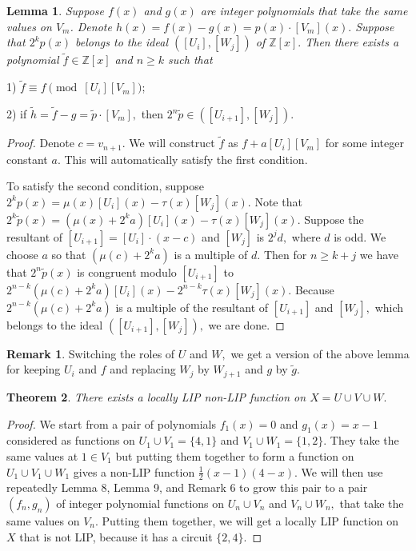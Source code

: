 \documentclass[10pt]{article}
\newtheorem{theorem}{Theorem}
\newtheorem{lemma}[theorem]{Lemma}
\theoremstyle{definition}
\newtheorem{remark}{Remark}
\begin{document}
\begin{lemma} Suppose $f(x)$ and $g(x)$ are integer polynomials that take the same values on $V_m$. Denote $h(x)=f(x)-g(x) = p(x) \cdot [V_m](x). $ Suppose that $2^kp(x)$ belongs to the ideal $([U_i],[W_j])$ of $\mathbb Z [x].$ Then there exists a polynomial $\tilde{f}\in \mathbb Z[x]$ and $n\geq k$ such that
\end{lemma}

1) $\tilde{f} \equiv f \pmod {[U_{i}][V_m]}$;

2)  if $\tilde{h}=  \tilde{f}- g =\tilde{p}\cdot [V_{m}],$ then $2^n\tilde{p}\in ([U_{i+1}],[W_j]).$  

\begin{proof} 
Denote $c=v_{n+1}.$ We will construct $\tilde{f}$ as $f+a[U_i][V_m]$ for some integer constant $a.$ This will automatically satisfy the first condition.

To satisfy the second condition, suppose $2^kp(x)=\mu(x)[U_i](x)-\tau(x)[W_j](x).$ Note that $2^k\tilde{p}(x)=(\mu(x)+2^k a )[U_i](x)-\tau(x)[W_j](x).$  Suppose the resultant of $[U_{i+1}]=[U_i]\cdot (x-c)$ and $[W_j]$ is $2^{j}d,$ where $d$ is odd. We choose $a$ so that $(\mu(c)+2^k a)$ is a multiple of $d$. Then for $n\geq k+j$ we have  that $2^n\tilde{p}(x)$ is congruent modulo $[U_{i+1}]$ to $2^{n-k}(\mu(c)+2^k a)[U_i](x)-2^{n-k}\tau(x)[W_j](x).$ Because $2^{n-k}(\mu(c)+2^k a)$ is a multiple of  the resultant of $[U_{i+1}]$ and $[W_j],$ which belongs to the ideal $([U_{i+1}],[W_j]),$ we are done.
\end{proof}

\begin{remark} Switching the roles of $U$ and $W,$ we get a version of the above lemma for keeping $U_i$ and $f$ and replacing $W_j$ by $W_{j+1}$ and $g$ by $\tilde{g}$.
\end{remark}

\begin{theorem} \label{TnonLIP} There exists a locally LIP non-LIP function on $X=U\cup V \cup W.$
\end{theorem}
\begin{proof}
We start from a pair of polynomials $f_1(x)=0$ and $g_1(x)=x-1$ considered as functions on $U_1\cup V_1 =\{4,1\}$ and $V_1\cup W_1=\{1,2\}.$ They take the same values at $1\in V_1$ but putting them together to form a function on  $U_1\cup V_1\cup W_1$ gives a non-LIP function $\frac{1}{2}(x-1)(4-x).$ We will then use repeatedly Lemma 8, Lemma 9, and Remark 6  to grow this pair to a pair $(f_n,g_n)$ of integer polynomial functions on $U_n\cup V_n$ and $V_n\cup W_n,$ that take the same values on $V_n$. Putting them together, we will get a locally LIP function on $X$ that is not LIP, because it has a circuit $\{2,4\}.$
\end{proof}
\end{document}
